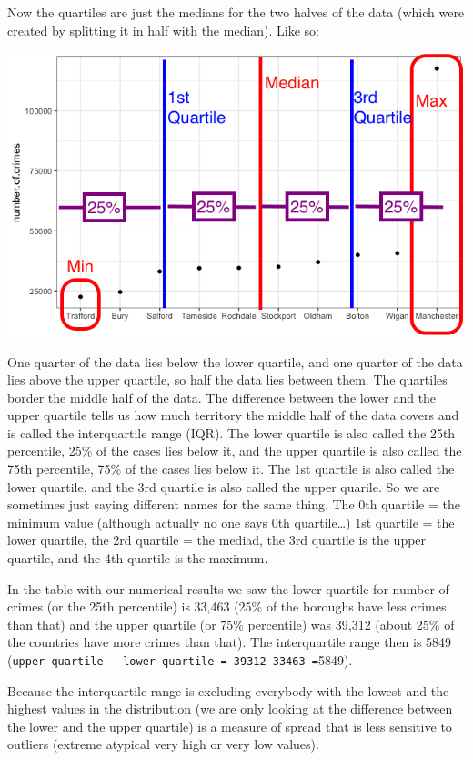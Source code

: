 \documentclass[]{book}
\theoremstyle{definition}
\theoremstyle{definition}
\theoremstyle{definition}
\theoremstyle{remark}
\begin{document}
Now the quartiles are just the medians for the two halves of the data
(which were created by splitting it in half with the median). Like so:

\includegraphics{imgs/crimes_dotplot_quart.png}

One quarter of the data lies below the lower quartile, and one quarter
of the data lies above the upper quartile, so half the data lies between
them. The quartiles border the middle half of the data. The difference
between the lower and the upper quartile tells us how much territory the
middle half of the data covers and is called the interquartile range
(IQR). The lower quartile is also called the 25th percentile, 25\% of
the cases lies below it, and the upper quartile is also called the 75th
percentile, 75\% of the cases lies below it. The 1st quartile is also
called the lower quartile, and the 3rd quartile is also called the upper
quarile. So we are sometimes just saying different names for the same
thing. The 0th quartile = the minimum value (although actually no one
says 0th quartile\ldots{}) 1st quartile = the lower quartile, the 2rd
quartile = the mediad, the 3rd quartile is the upper quartile, and the
4th quartile is the maximum.

In the table with our numerical results we saw the lower quartile for
number of crimes (or the 25th percentile) is 33,463 (25\% of the
boroughs have less crimes than that) and the upper quartile (or 75\%
percentile) was 39,312 (about 25\% of the countries have more crimes
than that). The interquartile range then is 5849
(\texttt{upper\ quartile\ -\ lower\ quartile\ =\ 39312-33463\ =}5849).

Because the interquartile range is excluding everybody with the lowest
and the highest values in the distribution (we are only looking at the
difference between the lower and the upper quartile) is a measure of
spread that is less sensitive to outliers (extreme atypical very high or
very low values).
\end{document}
